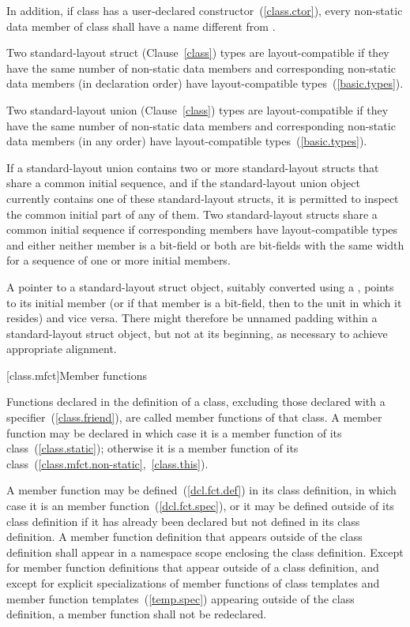 \pnum
In addition, if class  has a user-declared
constructor~(\ref{class.ctor}), every non-static data member of class
 shall have a name different from .

\pnum
Two standard-layout struct (Clause~\ref{class}) types are layout-compatible if they
have the same number of non-static data members and corresponding
non-static data members (in declaration order) have layout-compatible
types~(\ref{basic.types}).

\pnum
Two standard-layout union (Clause~\ref{class}) types are layout-compatible if they
have the same number of non-static data members and corresponding
non-static data members (in any order) have layout-compatible
types~(\ref{basic.types}).

\pnum
If a standard-layout union contains two or more
standard-layout structs that share a common
initial sequence, and if the standard-layout union object currently contains one of
these standard-layout structs, it is permitted to inspect the common initial part of
any of them. Two standard-layout structs share a common initial sequence if
corresponding members have layout-compatible types and either neither member is a bit-field or both are bit-fields with the same width for a sequence of one or more initial members.

\pnum
A pointer to a standard-layout struct object, suitably converted using a
, points to its initial member (or if that
member is a bit-field, then to the unit in which it resides) and vice
versa.
\enternote
There might therefore be unnamed padding within a standard-layout struct object, but
not at its beginning, as necessary to achieve appropriate alignment.
\exitnote

[class.mfct]{Member functions}%

\pnum
Functions declared in the definition of a class, excluding those
declared with a  specifier~(\ref{class.friend}), are
called member functions of that class. A member function may be declared
 in which case it is a  member function
of its class~(\ref{class.static}); otherwise it is a
 member function of its
class~(\ref{class.mfct.non-static},~\ref{class.this}).

\pnum
{}%
%
A member function may be defined~(\ref{dcl.fct.def}) in its class
definition, in which case it is an  member
function~(\ref{dcl.fct.spec}), or it may be defined outside of its class
definition if it has already been declared but not defined in its class
definition. A member function definition that appears outside of the
class definition shall appear in a namespace scope enclosing the class
definition. Except for member function definitions that appear outside
of a class definition, and except for explicit specializations of member
functions of class templates and member function
templates~(\ref{temp.spec}) appearing outside of the class definition, a
member function shall not be redeclared.

